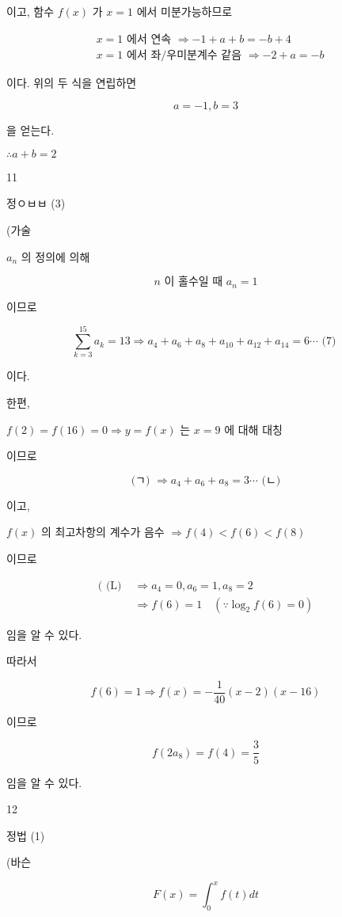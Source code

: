 \documentclass[10pt]{article}
\begin{document}
이고, 함수 \(f(x)\) 가 \(x=1\) 에서 미분가능하므로

\[
\begin{aligned}
& x=1 \text { 에서 연속 } \Rightarrow-1+a+b=-b+4 \\
& x=1 \text { 에서 좌/우미분계수 같음 } \Rightarrow-2+a=-b
\end{aligned}
\]

이다. 위의 두 식을 연립하면

\[
a=-1, b=3
\]

을 얻는다.

\(\therefore a+b=2\)

11

정ㅇㅂㅂ (3)

(가술

\(a_{n}\) 의 정의에 의해

\[
n \text { 이 홀수일 때 } a_{n}=1
\]

이므로

\[
\sum_{k=3}^{15} a_{k}=13 \Rightarrow a_{4}+a_{6}+a_{8}+a_{10}+a_{12}+a_{14}=6 \cdots \text { (7) }
\]

이다.

한편,

\(f(2)=f(16)=0 \Rightarrow y=f(x)\) 는 \(x=9\) 에 대해 대칭

이므로

\[
\text { (ㄱ) } \Rightarrow a_{4}+a_{6}+a_{8}=3 \cdots \text { (ㄴ) }
\]

이고,

\(f(x)\) 의 최고차항의 계수가 음수 \(\Rightarrow f(4)<f(6)<f(8)\)

이므로

\[
\begin{aligned}
(\text { (L) } & \Rightarrow a_{4}=0, a_{6}=1, a_{8}=2 \\
& \Rightarrow f(6)=1 \quad\left(\because \log _{2} f(6)=0\right)
\end{aligned}
\]

임을 알 수 있다.

따라서

\[
f(6)=1 \Rightarrow f(x)=-\frac{1}{40}(x-2)(x-16)
\]

이므로

\[
f\left(2 a_{8}\right)=f(4)=\frac{3}{5}
\]

임을 알 수 있다.

12

정법 (1)

(바슨

\[
F(x)=\int_{0}^{x} f(t) d t
\]
\end{document}
